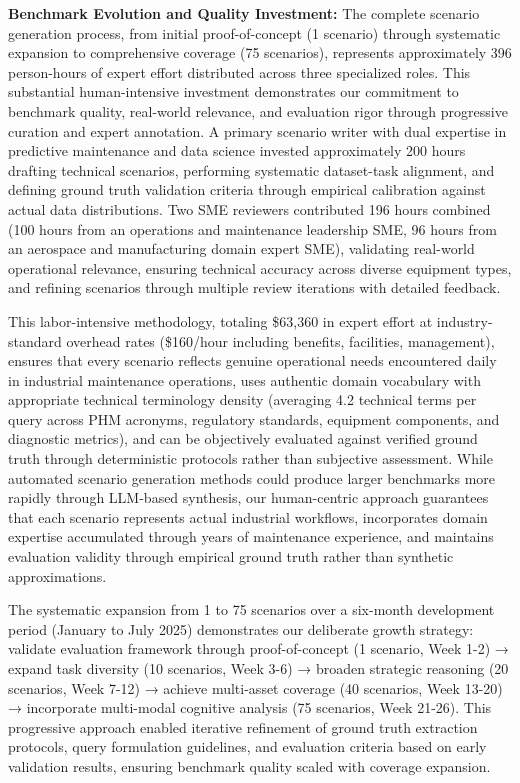 \documentclass[sigconf]{acmart}
\begin{document}
\textbf{Benchmark Evolution and Quality Investment:} The complete scenario generation process, from initial proof-of-concept (1 scenario) through systematic expansion to comprehensive coverage (75 scenarios), represents approximately 396 person-hours of expert effort distributed across three specialized roles. This substantial human-intensive investment demonstrates our commitment to benchmark quality, real-world relevance, and evaluation rigor through progressive curation and expert annotation. A primary scenario writer with dual expertise in predictive maintenance and data science invested approximately 200 hours drafting technical scenarios, performing systematic dataset-task alignment, and defining ground truth validation criteria through empirical calibration against actual data distributions. Two SME reviewers contributed 196 hours combined (100 hours from an operations and maintenance leadership SME, 96 hours from an aerospace and manufacturing domain expert SME), validating real-world operational relevance, ensuring technical accuracy across diverse equipment types, and refining scenarios through multiple review iterations with detailed feedback.

This labor-intensive methodology, totaling \$63,360 in expert effort at industry-standard overhead rates (\$160/hour including benefits, facilities, management), ensures that every scenario reflects genuine operational needs encountered daily in industrial maintenance operations, uses authentic domain vocabulary with appropriate technical terminology density (averaging 4.2 technical terms per query across PHM acronyms, regulatory standards, equipment components, and diagnostic metrics), and can be objectively evaluated against verified ground truth through deterministic protocols rather than subjective assessment. While automated scenario generation methods could produce larger benchmarks more rapidly through LLM-based synthesis, our human-centric approach guarantees that each scenario represents actual industrial workflows, incorporates domain expertise accumulated through years of maintenance experience, and maintains evaluation validity through empirical ground truth rather than synthetic approximations.

The systematic expansion from 1 to 75 scenarios over a six-month development period (January to July 2025) demonstrates our deliberate growth strategy: validate evaluation framework through proof-of-concept (1 scenario, Week 1-2) → expand task diversity (10 scenarios, Week 3-6) → broaden strategic reasoning (20 scenarios, Week 7-12) → achieve multi-asset coverage (40 scenarios, Week 13-20) → incorporate multi-modal cognitive analysis (75 scenarios, Week 21-26). This progressive approach enabled iterative refinement of ground truth extraction protocols, query formulation guidelines, and evaluation criteria based on early validation results, ensuring benchmark quality scaled with coverage expansion.
\end{document}
